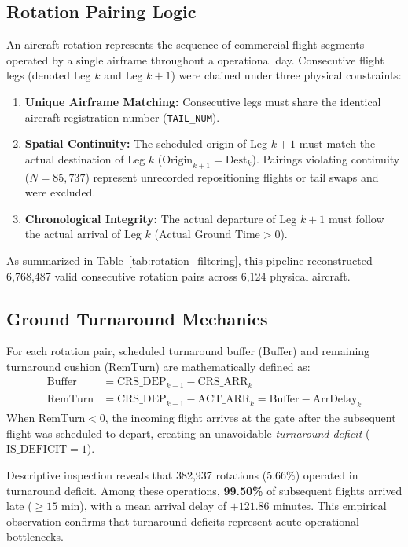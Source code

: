 \documentclass[conference]{IEEEtran}
\begin{document}
\subsection{Rotation Pairing Logic}
An aircraft rotation represents the sequence of commercial flight segments operated by a single airframe throughout a operational day. Consecutive flight legs (denoted Leg $k$ and Leg $k+1$) were chained under three physical constraints:
\begin{enumerate}
    \item \textbf{Unique Airframe Matching:} Consecutive legs must share the identical aircraft registration number (\texttt{TAIL\_NUM}).
    \item \textbf{Spatial Continuity:} The scheduled origin of Leg $k+1$ must match the actual destination of Leg $k$ ($\text{Origin}_{k+1} = \text{Dest}_{k}$). Pairings violating continuity ($N = 85,737$) represent unrecorded repositioning flights or tail swaps and were excluded.
    \item \textbf{Chronological Integrity:} The actual departure of Leg $k+1$ must follow the actual arrival of Leg $k$ ($\text{Actual Ground Time} > 0$).
\end{enumerate}
As summarized in Table~\ref{tab:rotation_filtering}, this pipeline reconstructed 6,768,487 valid consecutive rotation pairs across 6,124 physical aircraft.

\subsection{Ground Turnaround Mechanics}
For each rotation pair, scheduled turnaround buffer ($\text{Buffer}$) and remaining turnaround cushion ($\text{RemTurn}$) are mathematically defined as:
\begin{align}
\text{Buffer} &= \text{CRS\_DEP}_{k+1} - \text{CRS\_ARR}_{k} \\
\text{RemTurn} &= \text{CRS\_DEP}_{k+1} - \text{ACT\_ARR}_{k} = \text{Buffer} - \text{ArrDelay}_{k}
\end{align}
When $\text{RemTurn} < 0$, the incoming flight arrives at the gate after the subsequent flight was scheduled to depart, creating an unavoidable \textit{turnaround deficit} ($\text{IS\_DEFICIT} = 1$). 

Descriptive inspection reveals that 382,937 rotations (5.66\%) operated in turnaround deficit. Among these operations, \textbf{99.50\%} of subsequent flights arrived late ($\ge 15$ min), with a mean arrival delay of $+121.86$ minutes. This empirical observation confirms that turnaround deficits represent acute operational bottlenecks.
\end{document}
